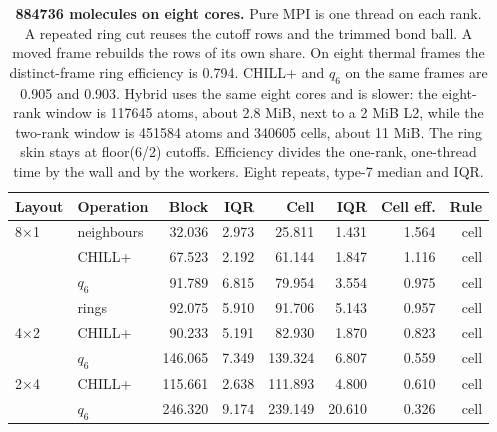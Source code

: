 \begin{table}[tbp]
\centering
\caption{\textbf{884736 molecules on eight cores.} Pure MPI is one thread on each rank. A repeated ring cut reuses the cutoff rows and the trimmed bond ball. A moved frame rebuilds the rows of its own share. On eight thermal frames the distinct-frame ring efficiency is 0.794. CHILL+ and $q_6$ on the same frames are 0.905 and 0.903. Hybrid uses the same eight cores and is slower: the eight-rank window is 117645 atoms, about 2.8 MiB, next to a 2 MiB L2, while the two-rank window is 451584 atoms and 340605 cells, about 11 MiB. The ring skin stays at floor(6/2) cutoffs. Efficiency divides the one-rank, one-thread time by the wall and by the workers. Eight repeats, type-7 median and IQR.}
\label{tab:partition-v17}
\begin{tabular}{llrrrrrr}
\toprule
Layout & Operation & Block & IQR & Cell & IQR & Cell eff. & Rule \\
\midrule
8$\times$1 & neighbours & 32.036 & 2.973 & 25.811 & 1.431 & 1.564 & cell \\
 & CHILL+ & 67.523 & 2.192 & 61.144 & 1.847 & 1.116 & cell \\
 & $q_6$ & 91.789 & 6.815 & 79.954 & 3.554 & 0.975 & cell \\
 & rings & 92.075 & 5.910 & 91.706 & 5.143 & 0.957 & cell \\
4$\times$2 & CHILL+ & 90.233 & 5.191 & 82.930 & 1.870 & 0.823 & cell \\
 & $q_6$ & 146.065 & 7.349 & 139.324 & 6.807 & 0.559 & cell \\
2$\times$4 & CHILL+ & 115.661 & 2.638 & 111.893 & 4.800 & 0.610 & cell \\
 & $q_6$ & 246.320 & 9.174 & 239.149 & 20.610 & 0.326 & cell \\
\bottomrule
\end{tabular}
\end{table}

